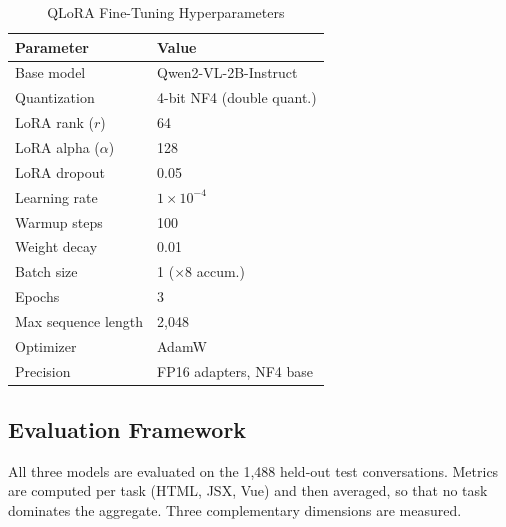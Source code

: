 \begin{table}[!t]
\centering
\caption{QLoRA Fine-Tuning Hyperparameters}
\label{tab:qlora_hyper}
\renewcommand{\arraystretch}{1.15}
\begin{tabular}{ll}
\hline
\textbf{Parameter} & \textbf{Value} \\
\hline
Base model            & Qwen2-VL-2B-Instruct \\
Quantization          & 4-bit NF4 (double quant.) \\
LoRA rank ($r$)       & 64 \\
LoRA alpha ($\alpha$) & 128 \\
LoRA dropout          & 0.05 \\
Learning rate         & $1 \times 10^{-4}$ \\
Warmup steps          & 100 \\
Weight decay          & 0.01 \\
Batch size            & 1 ($\times 8$ accum.) \\
Epochs                & 3 \\
Max sequence length   & 2{,}048 \\
Optimizer             & AdamW \\
Precision             & FP16 adapters, NF4 base \\
\hline
\end{tabular}
\end{table}

\subsection{Evaluation Framework}

All three models are evaluated on the 1,488 held-out test conversations.
Metrics are computed per task (HTML, JSX, Vue) and then averaged, so that no
task dominates the aggregate. Three complementary dimensions are measured.

